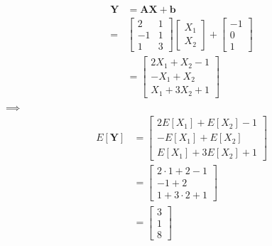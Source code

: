 \begin{problem}{15}
\begin{enumerate}
\begin{align*}
\bm Y &= \bm A \bm X +\bm b \\
=& \left[\begin{matrix}
    2 & 1 \\
    -1 & 1 \\
    1 & 3  
\end{matrix}\right] \begin{bmatrix} X_1 \\ X_2 \end{bmatrix}+\begin{bmatrix} -1 \\ 0 \\1 \end{bmatrix} \\
& = \begin{bmatrix} 2X_1+X_2-1 \\ -X_1+X_2 \\X_1+3X_2+1 \end{bmatrix}
\end{align*}
$\implies$
\begin{align*}
E[\bm Y] &=  \begin{bmatrix} 2E[X_1]+E[X_2]-1 \\ -E[X_1]+E[X_2] \\E[X_1]+3E[X_2]+1 \end{bmatrix}\\
& = \begin{bmatrix} 2\cdot 1+2-1 \\ -1+2 \\1+3\cdot 2+1 \end{bmatrix} \\
& = \begin{bmatrix} 3 \\ 1 \\8 \end{bmatrix} 
\end{align*}


\end{enumerate}
\end{problem}
